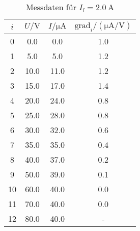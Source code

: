 \begin{table}
    \centering
    \begin{tabular}{S[table-format=:.0] S S S}
        \toprule
        {$i$} &
        {$U / \unit{\volt}$} &
        {$I/ \unit{\micro\ampere}$} &
        {$\text{grad}_i/ (\unit{\micro\ampere\per\volt})$} \\
           & 0.0       & 0.0    & 1.0 \\
        1   & 5.0       & 5.0    & 1.2 \\
        2   & 10.0      & 11.0    & 1.2 \\
        3   & 15.0      & 17.0    & 1.4 \\
        4   & 20.0      & 24.0    & 0.8 \\
        5   & 25.0      & 28.0    & 0.8 \\
        6   & 30.0      & 32.0    & 0.6 \\
        7   & 35.0      & 35.0    & 0.4 \\
        8   & 40.0      & 37.0    & 0.2 \\
        9   & 50.0      & 39.0    & 0.1 \\
        10   & 60.0     & 40.0    & 0.0 \\
        11   & 70.0     & 40.0    & 0.0 \\
        12   & 80.0     & 40.0    & {-} \\
        \bottomrule
    \end{tabular}
    \caption{Messdaten für $I_\text{f}= \qty{2.0}{\ampere}$}
    \label{tab:c01}
\end{table}